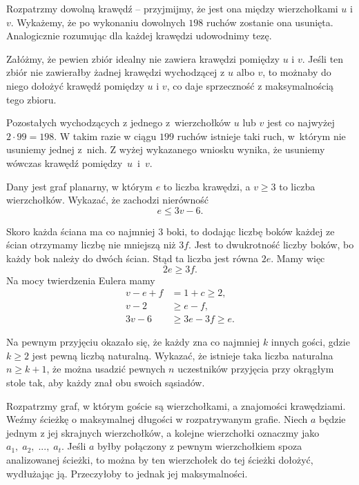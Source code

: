 \noindent
Rozpatrzmy dowolną krawędź -- przyjmijmy, że jest ona między wierzchołkami $u$ i $v$. Wykażemy, że po wykonaniu dowolnych $198$ ruchów zostanie ona usunięta. Analogicznie rozumując dla każdej krawędzi udowodnimy tezę.

\vspace{5px}
\noindent
Załóżmy, że pewien zbiór idealny nie zawiera krawędzi pomiędzy $u$ i $v$. Jeśli ten zbiór nie zawierałby żadnej krawędzi wychodzącej z $u$ albo $v$, to możnaby do niego dołożyć krawędź pomiędzy $u$ i $v$, co daje sprzeczność z maksymalnością tego zbioru. 

\vspace{5px}
\noindent
Pozostałych wychodzących z jednego z~wierzchołków $u$ lub $v$ jest co najwyżej $2 \cdot 99 = 198$. W takim razie w ciągu $199$ ruchów istnieje taki ruch, w~którym nie usuniemy jednej z~nich. Z wyżej wykazanego wniosku wynika, że usuniemy wówczas krawędź pomiędzy~$u$~i~$v$.

\begin{problem}{4}
	Dany jest graf planarny, w którym $e$ to liczba krawędzi, a $v \geqslant 3$ to liczba wierzchołków. Wykazać, że zachodzi nierówność
	\[
		e \leqslant 3v - 6.
	\]
\end{problem}

\noindent
Skoro każda ściana ma co najmniej $3$ boki, to dodając liczbę boków każdej ze ścian otrzymamy liczbę nie mniejszą niż $3f$. Jest to dwukrotność liczby boków, bo każdy bok należy do dwóch ścian. Stąd ta liczba jest równa $2e$. Mamy więc
\[
	2e \geqslant 3f.
\]
Na mocy twierdzenia Eulera mamy
\begin{align*}
	v - e + f &= 1 + c \geqslant 2, \\
	v - 2 &\geqslant e - f, \\
	3v  - 6 &\geqslant 3e - 3f \geqslant e.
\end{align*}

\begin{problem}{5}
	Na pewnym przyjęciu okazało się, że każdy zna co najmniej $k$ innych gości, gdzie $k \geqslant 2$ jest pewną liczbą naturalną. Wykazać, że istnieje taka liczba naturalna $n\geqslant k + 1$, że można usadzić pewnych $n$ uczestników przyjęcia przy okrągłym stole tak, aby każdy znał obu swoich sąsiadów.
\end{problem}

\noindent
Rozpatrzmy graf, w którym goście są wierzchołkami, a znajomości krawędziami.
Weźmy ścieżkę o maksymalnej długości w rozpatrywanym grafie. Niech $a$ będzie jednym z jej skrajnych wierzchołków, a kolejne wierzchołki oznaczmy jako $a_1,\; a_2,\; ...,\; a_t$. Jeśli $a$ byłby połączony z pewnym wierzchołkiem spoza analizowanej ścieżki, to można by ten wierzchołek do tej ścieżki dołożyć, wydłużając ją. Przeczyłoby to jednak jej maksymalności.

